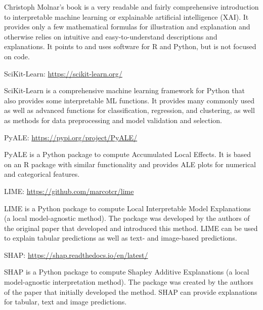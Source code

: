 Christoph Molnar's book is a very readable and fairly comprehensive introduction to interpretable machine learning or explainable artificial intelligence (XAI). It provides only a few mathematical formulas for illustration and explanation and otherwise relies on intuitive and easy-to-understand descriptions and explanations. It points to and uses software for R and Python, but is not focused on code.

\begin{tcolorbox}[colback=alert]
SciKit-Learn: \url{https://scikit-learn.org/}
\end{tcolorbox}

SciKit-Learn is a comprehensive machine learning framework for Python that also provides some interpretable ML functions. It provides many commonly used as well as advanced functions for classification, regression, and clustering, as well as methods for data preprocessing and model validation and selection.

\begin{tcolorbox}[colback=alert]
PyALE: \url{https://pypi.org/project/PyALE/}
\end{tcolorbox}

PyALE is a Python package to compute Accumulated Local Effects. It is based on an R package with similar functionality and provides ALE plots for numerical and categorical features.

\begin{tcolorbox}[colback=alert]
LIME: \url{https://github.com/marcotcr/lime}
\end{tcolorbox}

LIME is a Python package to compute Local Interpretable Model Explanations (a local model-agnostic method). The package was developed by the authors of the original paper that developed and introduced this method. LIME can be used to explain tabular predictions as well as text- and image-based predictions.

\begin{tcolorbox}[colback=alert]
SHAP: \url{https://shap.readthedocs.io/en/latest/}
\end{tcolorbox}

SHAP is a Python package to compute Shapley Additive Explanations (a local model-agnostic interpretation method). The package was created by the authors of the paper that initially developed the method. SHAP can provide explanations for tabular, text and image predictions. 


